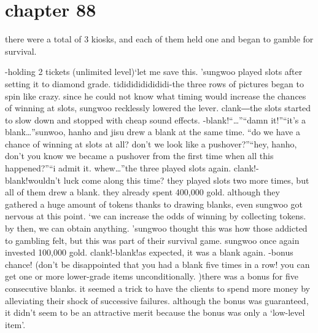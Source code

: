 \section{chapter 88}

                            there were a total of 3 kiosks, and each of them held one and began to gamble for survival.





-holding 2 tickets (unlimited level)‘let me save this.
’sungwoo played slots after setting it to diamond grade.
tidididididididi-the three rows of pictures began to spin like crazy.
 since he could not know what timing would increase the chances of winning at slots, sungwoo recklessly lowered the lever.
clank―the slots started to slow down and stopped with cheap sound effects.
-blank!“…”“damn it!”“it’s a blank…”sunwoo, hanho and jisu drew a blank at the same time.
“do we have a chance of winning at slots at all? don’t we look like a pushover?”“hey, hanho, don’t you know we became a pushover from the first time when all this happened?”“i admit it.
 whew…”the three played slots again.
clank!-blank!wouldn’t luck come along this time? they played slots two more times, but all of them drew a blank.
they already spent 400,000 gold.
 although they gathered a huge amount of tokens thanks to drawing blanks, even sungwoo got nervous at this point.
‘we can increase the odds of winning by collecting tokens.
 by then, we can obtain anything.
’sungwoo thought this was how those addicted to gambling felt, but this was part of their survival game.
 sungwoo once again invested 100,000 gold.
clank!-blank!as expected, it was a blank again.
-bonus chance! (don’t be disappointed that you had a blank five times in a row! you can get one or more lower-grade items unconditionally.
)there was a bonus for five consecutive blanks.
 it seemed a trick to have the clients to spend more money by alleviating their shock of successive failures.
 although the bonus was guaranteed, it didn’t seem to be an attractive merit because the bonus was only a ‘low-level item’.

